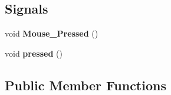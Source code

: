 \subsection*{Signals}
\begin{DoxyCompactItemize}
\item 
void {\bfseries Mouse\+\_\+\+Pressed} ()\hypertarget{class_map__traffic_a7283837f04acc737d88be032e7153444}{}\label{class_map__traffic_a7283837f04acc737d88be032e7153444}

\item 
void {\bfseries pressed} ()\hypertarget{class_map__traffic_a5ae14a365c39c920f4e032898263ce42}{}\label{class_map__traffic_a5ae14a365c39c920f4e032898263ce42}

\end{DoxyCompactItemize}
\subsection*{Public Member Functions}
